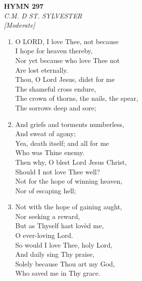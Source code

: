 \documentclass[11pt,a4paper]{article}
\begin{document}
\newpage
\begin{center}
    {\Large \textbf{HYMN 297}}
    \\
    \textit{C.M. D ST. SYLVESTER}
    \\
    \textit{\small [Moderate]}
\end{center}
\vspace{1em}

\begin{enumerate}
    \item O LORD, I love Thee, not because \\
        I hope for heaven thereby, \\
        Nor yet because who love Thee not \\
        Are lost eternally. \\
        Thou, O Lord Jesus, didst for me \\
        The shameful cross endure, \\
        The crown of thorns, the nails, the spear, \\
        The sorrows deep and sore;

    \item And griefs and torments numberless, \\
        And sweat of agony; \\
        Yea, death itself; and all for me \\
        Who was Thine enemy. \\
        Then why, O blest Lord Jesus Christ, \\
        Should I not love Thee well? \\
        Not for the hope of winning heaven, \\
        Nor of escaping hell;

    \item Not with the hope of gaining aught, \\
        Nor seeking a reward, \\
        But as Thyself hast lov\`ed me, \\
        O ever-loving Lord. \\
        So would I love Thee, holy Lord, \\
        And daily sing Thy praise, \\
        Solely because Thou art my God, \\
        Who saved me in Thy grace.

\end{enumerate}
\end{document}

